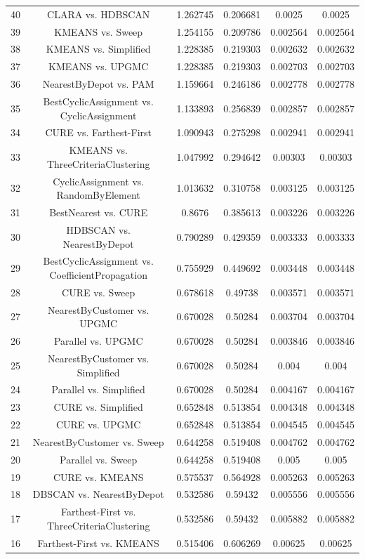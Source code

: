 \documentclass[a4paper,10pt]{article}
\begin{document}
\begin{landscape}
\begin{table}[!htp]
\begin{tabular}{cccccc}
40&CLARA vs. HDBSCAN&1.262745&0.206681&0.0025&0.0025\\
39&KMEANS vs. Sweep&1.254155&0.209786&0.002564&0.002564\\
38&KMEANS vs. Simplified&1.228385&0.219303&0.002632&0.002632\\
37&KMEANS vs. UPGMC&1.228385&0.219303&0.002703&0.002703\\
36&NearestByDepot vs. PAM&1.159664&0.246186&0.002778&0.002778\\
35&BestCyclicAssignment vs. CyclicAssignment&1.133893&0.256839&0.002857&0.002857\\
34&CURE vs. Farthest-First&1.090943&0.275298&0.002941&0.002941\\
33&KMEANS vs. ThreeCriteriaClustering&1.047992&0.294642&0.00303&0.00303\\
32&CyclicAssignment vs. RandomByElement&1.013632&0.310758&0.003125&0.003125\\
31&BestNearest vs. CURE&0.8676&0.385613&0.003226&0.003226\\
30&HDBSCAN vs. NearestByDepot&0.790289&0.429359&0.003333&0.003333\\
29&BestCyclicAssignment vs. CoefficientPropagation&0.755929&0.449692&0.003448&0.003448\\
28&CURE vs. Sweep&0.678618&0.49738&0.003571&0.003571\\
27&NearestByCustomer vs. UPGMC&0.670028&0.50284&0.003704&0.003704\\
26&Parallel vs. UPGMC&0.670028&0.50284&0.003846&0.003846\\
25&NearestByCustomer vs. Simplified&0.670028&0.50284&0.004&0.004\\
24&Parallel vs. Simplified&0.670028&0.50284&0.004167&0.004167\\
23&CURE vs. Simplified&0.652848&0.513854&0.004348&0.004348\\
22&CURE vs. UPGMC&0.652848&0.513854&0.004545&0.004545\\
21&NearestByCustomer vs. Sweep&0.644258&0.519408&0.004762&0.004762\\
20&Parallel vs. Sweep&0.644258&0.519408&0.005&0.005\\
19&CURE vs. KMEANS&0.575537&0.564928&0.005263&0.005263\\
18&DBSCAN vs. NearestByDepot&0.532586&0.59432&0.005556&0.005556\\
17&Farthest-First vs. ThreeCriteriaClustering&0.532586&0.59432&0.005882&0.005882\\
16&Farthest-First vs. KMEANS&0.515406&0.606269&0.00625&0.00625\\

\end{tabular}
\end{table}
\end{landscape}
\end{document}
